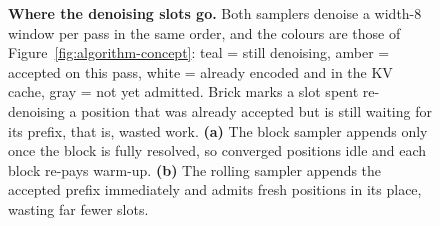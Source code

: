 \begin{figure}[tbp]
\caption{\textbf{Where the denoising slots go.} Both samplers denoise a
width-$8$ window per pass in the same order, and the colours are those of
Figure~\ref{fig:algorithm-concept}: teal = still denoising, amber = accepted
on this pass, white = already encoded and in the KV cache, gray = not yet
admitted.  Brick marks a slot spent re-denoising a position that was already
accepted but is still waiting for its prefix, that is, wasted work.
\textbf{(a)} The block sampler appends only once the block is fully resolved,
so converged positions idle and each block re-pays warm-up.  \textbf{(b)} The
rolling sampler appends the accepted prefix immediately and admits fresh
positions in its place, wasting far fewer slots.}
\label{fig:block-vs-rolling}
\end{figure}